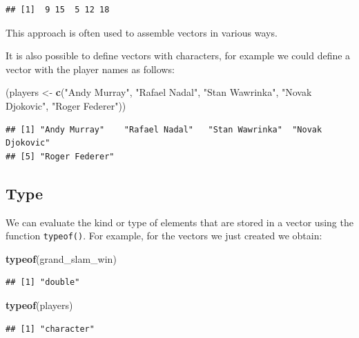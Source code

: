 \documentclass[12pt,]{krantz}
\newenvironment{Shaded}{\begin{snugshade}}{\end{snugshade}}
\newcommand{\KeywordTok}[1]{\textcolor[rgb]{0.27,0.27,0.27}{\textbf{#1}}}
\newcommand{\StringTok}[1]{\textcolor[rgb]{0.5,0.5,0.5}{#1}}
\newcommand{\NormalTok}[1]{#1}
\begin{document}
\begin{verbatim}
## [1]  9 15  5 12 18
\end{verbatim}

This approach is often used to assemble vectors in various ways.

It is also possible to define vectors with characters, for example we
could define a vector with the player names as follows:

\begin{Shaded}
\begin{Highlighting}[]
\NormalTok{(players <-}\StringTok{ }\KeywordTok{c}\NormalTok{(}\StringTok{"Andy Murray"}\NormalTok{, }\StringTok{"Rafael Nadal"}\NormalTok{, }\StringTok{"Stan Wawrinka"}\NormalTok{, }
             \StringTok{"Novak Djokovic"}\NormalTok{, }\StringTok{"Roger Federer"}\NormalTok{))}
\end{Highlighting}
\end{Shaded}

\begin{verbatim}
## [1] "Andy Murray"    "Rafael Nadal"   "Stan Wawrinka"  "Novak Djokovic"
## [5] "Roger Federer"
\end{verbatim}

\subsection{Type}\label{type}

We can evaluate the kind or type of elements that are stored in a vector
using the function \texttt{typeof()}. For example, for the vectors we
just created we obtain:

\begin{Shaded}
\begin{Highlighting}[]
\KeywordTok{typeof}\NormalTok{(grand_slam_win)}
\end{Highlighting}
\end{Shaded}

\begin{verbatim}
## [1] "double"
\end{verbatim}

\begin{Shaded}
\begin{Highlighting}[]
\KeywordTok{typeof}\NormalTok{(players)}
\end{Highlighting}
\end{Shaded}

\begin{verbatim}
## [1] "character"
\end{verbatim}
\end{document}
